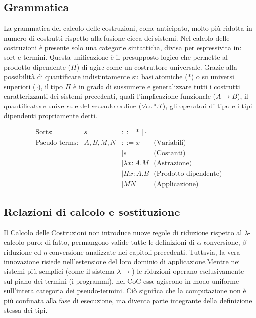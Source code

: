 \subsection{Grammatica}
La grammatica del calcolo delle costruzioni, come anticipato, molto più ridotta in numero di costrutti rispetto alla fusione cieca dei sistemi. Nel calcolo delle costruzioni
è presente solo una categorie sintatticha, divisa per espressivita in: sort e termini. Questa unificazione è il presupposto logico che permette al prodotto dipendente ($\Pi$) 
di agire come un costruttore universale. Grazie alla possibilità di quantificare indistintamente su basi atomiche ($\ast$) o su universi superiori ($\square$), il tipo $\Pi$ 
è in grado di sussumere e generalizzare tutti i costrutti caratterizzanti dei sistemi precedenti, quali l'implicazione funzionale ($A \to B$), il quantificatore universale del 
secondo ordine ($\forall \alpha : \ast . T$), gli operatori di tipo e i tipi dipendenti propriamente detti.

\begin{equation}
    \begin{array}{lrll}
        \text{Sorts:}           & s           & ::= \ast \mid \square   &                               \\
        \text{Pseudo-terms:}    & A, B, M, N  & ::= x                   & \text{(Variabili)}            \\
                                &             & \mid s                  & \text{(Costanti)}             \\
                                &             & \mid \lambda x : A.M    & \text{(Astrazione)}           \\
                                &             & \mid \Pi x : A.B        & \text{(Prodotto dipendente)}  \\
                                &             & \mid M N                & \text{(Applicazione)}
    \end{array}
    \tag{CoC}
    \label{eq:coc_grammar}
\end{equation}

\subsection{Relazioni di calcolo e sostituzione}
Il Calcolo delle Costruzioni non introduce nuove regole di riduzione rispetto al $\lambda$-calcolo puro; di fatto, permangono valide tutte le definizioni di 
$\alpha$-conversione, $\beta$-riduzione ed $\eta$-conversione analizzate nei capitoli precedenti. Tuttavia, la vera innovazione risiede nell'estensione del 
loro dominio di applicazione.Mentre nei sistemi più semplici (come il sistema $\lambda{\to}$) le riduzioni operano esclusivamente sul piano dei termini (i programmi),
nel CoC esse agiscono in modo uniforme sull'intera categoria dei pseudo-termini. Ciò significa che la computazione non è più confinata alla fase di esecuzione, 
ma diventa parte integrante della definizione stessa dei tipi.

